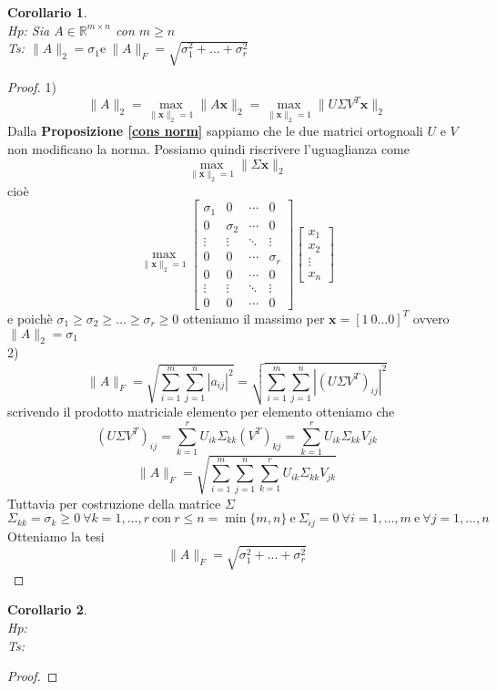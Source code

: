 \documentclass[11pt]{article}
\newtheorem{corollary}{Corollario}
\newcommand{\R}{\mathbb R}
\begin{document}
\begin{corollary}
\textbf{}\\
\textit{Hp:} Sia $A\in \R^{m \times n}$ con $m \geq n$ \\
\textit{Ts:} $\|A\|_2=\sigma_1 \text{e} \  \|A\|_F=\sqrt{\sigma_1^2 + \dots + \sigma_r^2}$
\end{corollary}
\begin{proof}
1) \[ \|A\|_2 = \max_{\|\mathbf{x}\|_2 =1} \|A\mathbf{x}\|_2 = \max_{\|\mathbf{x}\|_2 =1} \| U \Sigma V^T \mathbf{x} \|_2 \]
Dalla \textbf{Proposizione \ref{cons norm}} sappiamo che le due matrici ortognoali $U$ e $V$ non modificano la norma. Possiamo quindi riscrivere l'uguaglianza come $$\max_{\|\mathbf{x}\|_2 =1} \|\Sigma \mathbf{x}\|_2 $$ cioè $$\max_{\|\mathbf{x}\|_2 =1} \begin{bmatrix}
\sigma_1 & 0 & \cdots & 0 \\
0 & \sigma_2 & \cdots & 0 \\
\vdots & \vdots & \ddots & \vdots \\
0 & 0 & \cdots & \sigma_r \\
0 & 0 & \cdots & 0 \\
\vdots & \vdots & \ddots & \vdots \\
0 & 0 & \cdots & 0
\end{bmatrix} \begin{bmatrix}
x_1 \\
x_2 \\
\vdots \\
x_n
\end{bmatrix}$$ 
e poichè $\sigma_1 \geq \sigma_2 \geq \dots \geq \sigma_r \geq 0$ otteniamo il massimo per $\mathbf{x}=[1 \ 0 \dots 0]^T$ ovvero $\|A\|_2= \sigma_1$
\\2)$$\|A\|_F=\sqrt{\sum_{i=1}^m\sum_{j=1}^n|a_{ij}|^2}=\sqrt{\sum_{i=1}^m\sum_{j=1}^n|(U\Sigma V^T)_{ij}|^2}$$
scrivendo il prodotto matriciale elemento per elemento otteniamo che $$(U\Sigma V^T)_{ij} = \sum_{k=1}^{r} U_{ik} \Sigma_{kk} (V^T)_{kj}=\sum_{k=1}^{r} U_{ik} \Sigma_{kk}V_{jk}$$
$$ \|A\|_F=\sqrt{\sum_{i=1}^m\sum_{j=1}^n \sum_{k=1}^{r} U_{ik} \Sigma_{kk}V_{jk}} $$ 
Tuttavia per costruzione della matrice $\Sigma$ $$\Sigma_{kk}=\sigma_k \geq 0 \ \forall k=1,\dots,r \ \text{con} \ r\leq n=\min{\{m,n\}} \ \text{e} \ \Sigma_{ij}=0 \ \forall i=1, \dots, m \ \text{e} \ \forall j=1, \dots, n$$
Otteniamo la tesi $$\|A\|_F=\sqrt{\sigma_1^2 + \dots + \sigma_r^2}$$

\end{proof}

\begin{corollary}
\textbf{}\\
\textit{Hp:}\\
\textit{Ts:} 
\end{corollary}
\begin{proof}
\end{proof}
\end{document}
